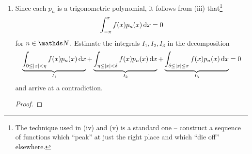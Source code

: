 \documentclass{../homework}
\begin{document}
\begin{Exercise}
\begin{enumerate}
    \begin{solution}

    \end{solution}

  \item Since each \(p_n\) is a trigonometric polynomial, it follows
    from (iii) that\footnote{The technique used in (iv) and (v) is a
      standard one -- construct a sequence of functions which ``peak''
      at just the right place and which ``die off'' elsewhere.}
    \begin{equation*}
      \int_{-\pi}^{\pi} f(x) p_n(x)\mathop{}\! \mathrm d x = 0
    \end{equation*}
    for \(n \in \N\).  Estimate the integrals \(I_1,I_2,I_3\) in the
    decomposition
    \begin{equation}
      \label{eq-TripleSum}
      \underbrace{\int_{0 \le \lvert {x} \rvert < \eta}
        f(x) p_n(x) \mathop{}\! \mathrm d x}_{I_1}
      + \underbrace{\int_{\eta \le \lvert {x} \rvert < \delta}
        f(x) p_n(x) \mathop{}\! \mathrm d x}_{I_2}
      + \underbrace{\int_{\delta \le \lvert {x} \rvert \le \pi}
        f(x) p_n(x) \mathop{}\! \mathrm d x}_{I_3} = 0
    \end{equation}
    and arrive at a contradiction.

    \begin{solution}
      \begin{proof}

      \end{proof}
    \end{solution}
  \end{enumerate}
\end{Exercise}
\end{document}

